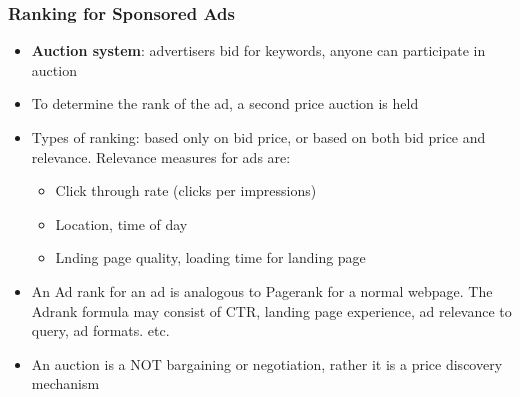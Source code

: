\documentclass{article}
\begin{document}
\subsubsection{Ranking for Sponsored Ads}
\begin{itemize}
    \item \textbf{Auction system}: advertisers bid for keywords, anyone can participate in auction
    
    \item To determine the rank of the ad, a second price auction is held
    
    \item Types of ranking: based only on bid price, or based on both bid price and relevance. Relevance measures for ads are:
    \begin{itemize}
        \item Click through rate (clicks per impressions)
        
        \item Location, time of day
        
        \item Lnding page quality, loading time for landing page
    \end{itemize}
    
    \item An Ad rank for an ad is analogous to Pagerank for a normal webpage. The Adrank formula may consist of CTR, landing page experience, ad relevance to query, ad formats. etc.
    
    \item An auction is a NOT bargaining or negotiation, rather it is a price discovery mechanism
\end{itemize}
\end{document}
